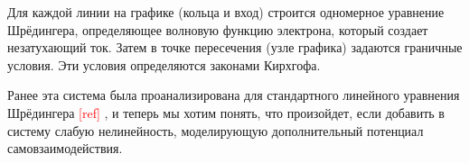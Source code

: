 \documentclass[A4,12pt,oneside]{article}
\renewcommand{\(}{\left(}
\renewcommand{\)}{\right)}
\newcommand{\citeph}{\textcolor{red}{[ref] }}
\begin{document}
Для каждой линии на графике (кольца и вход) строится одномерное уравнение Шрёдингера, определяющее волновую функцию электрона, который создает незатухающий ток. Затем в точке пересечения (узле графика) задаются граничные условия. Эти условия определяются законами Кирхгофа.

Ранее эта система была проанализирована для стандартного линейного уравнения Шрёдингера \citeph, и теперь мы хотим понять, что произойдет, если добавить в систему слабую нелинейность, моделирующую дополнительный потенциал самовзаимодействия.
  
\end{document}
